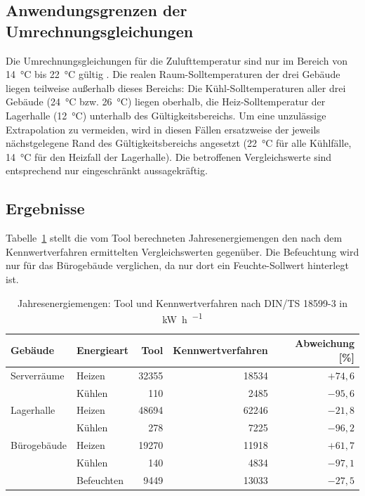 \documentclass{scrreprt}
\begin{document}
\subsection{Anwendungsgrenzen der Umrechnungsgleichungen}
Die Umrechnungsgleichungen für die Zulufttemperatur sind nur im
Bereich von \SI{14}{\celsius} bis \SI{22}{\celsius} gültig
\parencite{DIN185993}. Die realen Raum-Solltemperaturen der drei
Gebäude liegen teilweise außerhalb dieses Bereichs: Die
Kühl-Solltemperaturen aller drei Gebäude (\SI{24}{\celsius} bzw.
\SI{26}{\celsius}) liegen oberhalb, die Heiz-Solltemperatur der
Lagerhalle (\SI{12}{\celsius}) unterhalb des Gültigkeitsbereichs. Um
eine unzulässige Extrapolation zu vermeiden, wird in diesen Fällen
ersatzweise der jeweils nächstgelegene Rand des Gültigkeitsbereichs
angesetzt (\SI{22}{\celsius} für alle Kühlfälle, \SI{14}{\celsius} für
den Heizfall der Lagerhalle). Die betroffenen Vergleichswerte sind
entsprechend nur eingeschränkt aussagekräftig.

\subsection{Ergebnisse}
Tabelle~\ref{tab:VergleichKennwertverfahren} stellt die vom Tool
berechneten Jahresenergiemengen den nach dem Kennwertverfahren
ermittelten Vergleichswerten gegenüber. Die Befeuchtung wird nur für
das Bürogebäude verglichen, da nur dort ein Feuchte-Sollwert
hinterlegt ist.

\begin{table}[H]
    \centering
    \caption{Jahresenergiemengen: Tool und Kennwertverfahren nach DIN/TS 18599-3 in \si{\kilo\watt\hour\per\year}}
    \label{tab:VergleichKennwertverfahren}
    \begin{tabular}{llrrr}
        \toprule
        Gebäude & Energieart & Tool & Kennwertverfahren & Abweichung [\%] \\
        \midrule
        Serverräume & Heizen & \num{32355} & \num{18534} & $+74{,}6$ \\
                    & Kühlen & \num{110} & \num{2485} & $-95{,}6$ \\
        \midrule
        Lagerhalle & Heizen & \num{48694} & \num{62246} & $-21{,}8$ \\
                   & Kühlen & \num{278} & \num{7225} & $-96{,}2$ \\
        \midrule
        Bürogebäude & Heizen & \num{19270} & \num{11918} & $+61{,}7$ \\
                    & Kühlen & \num{140} & \num{4834} & $-97{,}1$ \\
                    & Befeuchten & \num{9449} & \num{13033} & $-27{,}5$ \\
        \bottomrule
    \end{tabular}
\end{table}
\end{document}
